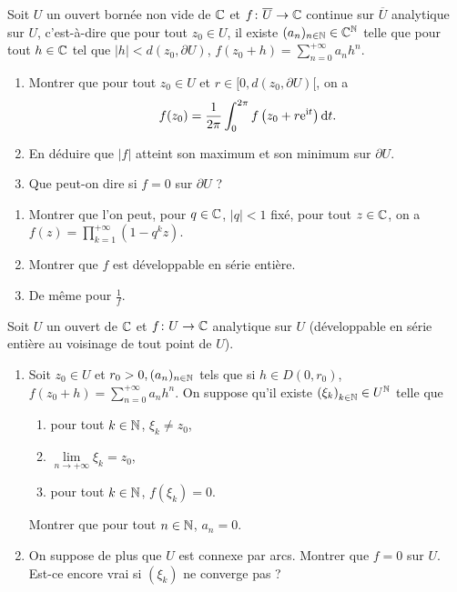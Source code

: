 \documentclass[12pt]{article}
\begin{document}
\begin{exercise}
    Soit $U$ un ouvert bornée non vide de $\mathbb{C}$ et $f\colon\overline{U}\to\mathbb{C}$ continue sur $\overline{U}$ analytique sur $U$, c'est-à-dire que pour tout $z_0\in U$, il existe $(a_n)_{n\in\mathbb{N}}\in\mathbb{C}^{\mathbb{N}}$ telle que pour tout $h\in\mathbb{C}$ tel que $\left\lvert h\right\rvert<d(z_{0},\partial U)$, $f(z_{0}+h)=\sum_{n=0}^{+\infty}a_n h^{n}$.
    \begin{enumerate}
        \item Montrer que pour tout $z_{0}\in U$ et $r\in[0,d(z_{0},\partial U)[$, on a 
        \begin{equation}
            f(z_{0})=\frac{1}{2\pi}\int_{0}^{2\pi}f\left(z_0+r\mathrm{e}^{\mathrm{i} t}\right)\mathrm{d} t.
        \end{equation}
        \item En déduire que $\left\lvert f\right\rvert$ atteint son maximum et son minimum sur $\partial U$.
        \item Que peut-on dire si $f=0$ sur $\partial U$ ?
    \end{enumerate}
\end{exercise}

\begin{exercise}
    \phantom{}
    \begin{enumerate}
        \item Montrer que l'on peut, pour $q\in\mathbb{C}$, $\left\lvert q\right\rvert<1$ fixé, pour tout $z\in\mathbb{C}$, on a $f(z)=\prod_{k=1}^{+\infty}\left(1-q^{k}z\right)$.
        \item Montrer que $f$ est développable en série entière.
        \item De même pour $\frac{1}{f}$.
    \end{enumerate}
\end{exercise}

\begin{exercise}
    Soit $U$ un ouvert de $\mathbb{C}$ et $f\colon U\to\mathbb{C}$ analytique sur $U$ (développable en série entière au voisinage de tout point de $U$).
    \begin{enumerate}
        \item Soit $z_{0}\in U$ et $r_0>0, (a_{n})_{n\in\mathbb{N}}$ tels que si $h\in D(0,r_0)$, $f(z_{0}+h)=\sum_{n=0}^{+\infty}a_n h^{n}$. On suppose qu'il existe $\left(\xi_{k}\right)_{k\in\mathbb{N}}\in U^{\mathbb{N}}$ telle que 
        \begin{enumerate}[label=(\roman*)]
            \item pour tout $k\in\mathbb{N}$, $\xi_{k}\neq z_{0}$,
            \item $\lim\limits_{n\to+\infty}\xi_{k}=z_{0}$,
            \item pour tout $k\in\mathbb{N}$, $f(\xi_{k})=0$.
        \end{enumerate}
        Montrer que pour tout $n\in\mathbb{N}$, $a_n=0$.

        \item On suppose de plus que $U$ est connexe par arcs. Montrer que $f=0$ sur $U$. Est-ce encore vrai si $\left(\xi_{k}\right)$ ne converge pas ?
    \end{enumerate}
\end{exercise}
\end{document}
